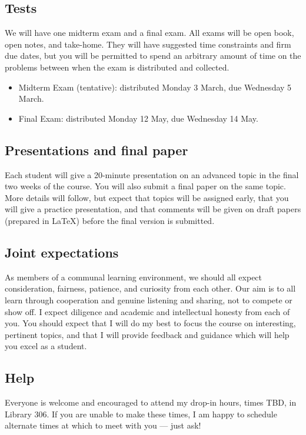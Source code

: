 \documentclass[11pt,twoside]{amsart}
\begin{document}
\subsection*{Tests}
We will have one midterm exam and a final exam. All exams will be open book, open notes, and take-home.  They will have suggested time constraints and firm due dates, but you will be permitted to spend an arbitrary amount of time on the problems between when the exam is distributed and collected. 

\begin{itemize}
\item Midterm Exam (tentative): distributed Monday 3 March, due Wednesday 5 March.
\item Final Exam: distributed Monday 12 May, due Wednesday 14 May.
\end{itemize}

\subsection*{Presentations and final paper}
Each student will give a 20-minute presentation on an advanced topic in the final two weeks of the course.  You will also submit a final paper on the same topic.  More details will follow, but expect that topics will be assigned early, that you will give a practice presentation, and that comments will be given on draft papers (prepared in \LaTeX) before the final version is submitted.

\subsection*{Joint expectations}
As members of a communal learning environment, we should all expect consideration, fairness, patience, and curiosity from each other.  Our aim is to all learn through cooperation and genuine listening and sharing, not to compete or show off.  I expect diligence and academic and intellectual honesty from each of you.  You should expect that I will do my best to focus the course on interesting, pertinent topics, and that I will provide feedback and guidance which will help you excel as a student.

\subsection*{Help}
Everyone is welcome and encouraged to attend my drop-in hours, times TBD, in Library 306.  If you are unable to make these times, I am happy to schedule alternate times at which to meet with you --- just ask!
\end{document}
